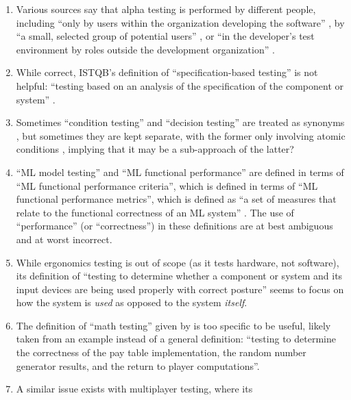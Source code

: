 \begin{enumerate}
            (p.~314) and ``total correctness'' (p.~480).
      \item Various sources say that alpha testing is performed by different
            people, including ``only by users within the organization
            developing the software'' \citep[p.~17]{IEEE2017}, by ``a small,
            selected group of potential users'' \citep[p.~5-8]{SWEBOK2024}, or
            ``in the developer's test environment by roles outside the
            development organization'' .
      \item While correct, ISTQB's definition of ``specification-based testing''
            is not helpful: ``testing based on an analysis of the specification
            of the component or system'' .
      \item Sometimes ``condition testing'' and ``decision testing'' are treated
            as synonyms \citep[p.~5-13]{SWEBOK2024}, but sometimes they are kept
            separate, with the former only involving atomic conditions
            , implying that it may be a sub-approach of the
            latter?
      \item ``ML model testing'' and ``ML functional performance'' are defined
            in terms of ``ML functional performance criteria'', which is defined
            in terms of ``ML functional performance metrics'', which is defined
            as ``a set of measures that relate to the functional correctness of
            an ML system'' . The use of ``performance'' (or
            ``correctness'') in these definitions are at best ambiguous and at
            worst incorrect.
      \item While ergonomics testing is out of scope (as it tests hardware, not
            software), its definition of ``testing to determine whether a
            component or system and its input devices are being used properly
            with correct posture''  seems to focus on how the
            system is \emph{used} as opposed to the system \emph{itself}.
      \item The definition of ``math testing'' given by  is
            too specific to be useful, likely taken from an example instead of
            a general definition: ``testing to determine the correctness of the
            pay table implementation, the random number generator results, and
            the return to player computations''.
      \item A similar issue exists with multiplayer testing, where its

\end{enumerate}

